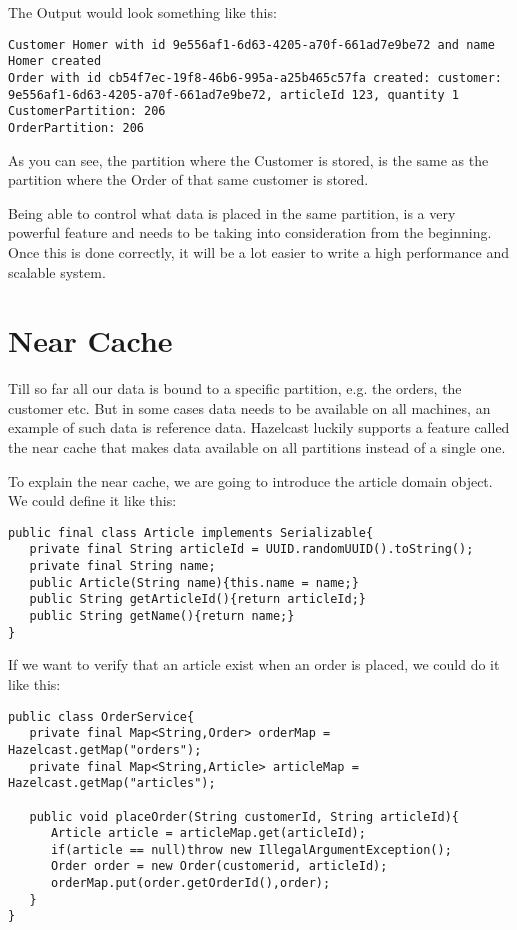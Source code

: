 The Output would look something like this:

\begin{verbatim}
Customer Homer with id 9e556af1-6d63-4205-a70f-661ad7e9be72 and name Homer created
Order with id cb54f7ec-19f8-46b6-995a-a25b465c57fa created: customer: 9e556af1-6d63-4205-a70f-661ad7e9be72, articleId 123, quantity 1
CustomerPartition: 206
OrderPartition: 206
\end{verbatim}

As you can see, the partition where the Customer is stored, is the same as the partition where the Order of that same customer is stored. 

Being able to control what data is placed in the same partition, is a very powerful feature and needs to be taking into consideration from the beginning. Once this is done correctly, it will be a lot easier to write a high performance and scalable system. 

\section{Near Cache}

Till so far all our data is bound to a specific partition, e.g. the orders, the customer etc. But in some cases data needs to be available on all machines, an example of such data is reference data. Hazelcast luckily supports a feature called the near cache that makes data available on all partitions instead of a single one.

To explain the near cache, we are going to introduce the article domain object. We could define it like this:

\begin{verbatim}
public final class Article implements Serializable{
   private final String articleId = UUID.randomUUID().toString();
   private final String name;
   public Article(String name){this.name = name;}
   public String getArticleId(){return articleId;}
   public String getName(){return name;}
}
\end{verbatim}

If we want to verify that an article exist when an order is placed, we could do it like this:

\begin{verbatim}
public class OrderService{
   private final Map<String,Order> orderMap = Hazelcast.getMap("orders");
   private final Map<String,Article> articleMap = Hazelcast.getMap("articles");

   public void placeOrder(String customerId, String articleId){
      Article article = articleMap.get(articleId);
      if(article == null)throw new IllegalArgumentException();
      Order order = new Order(customerid, articleId);
      orderMap.put(order.getOrderId(),order);
   }
}
\end{verbatim}


